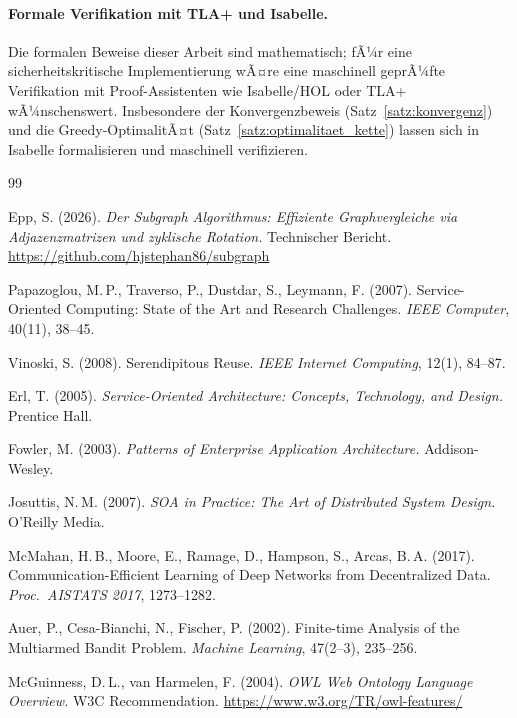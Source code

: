 ﻿\documentclass[a4paper,12pt]{article}
\theoremstyle{definition}
\begin{document}
\paragraph{Formale Verifikation mit TLA+ und Isabelle.}
Die formalen Beweise dieser Arbeit sind mathematisch; fÃ¼r eine sicherheitskritische Implementierung wÃ¤re eine maschinell geprÃ¼fte Verifikation mit Proof-Assistenten wie Isabelle/HOL \cite{nipkow2002} oder TLA+ \cite{lamport2002} wÃ¼nschenswert. Insbesondere der Konvergenzbeweis (Satz~\ref{satz:konvergenz}) und die Greedy-OptimalitÃ¤t (Satz~\ref{satz:optimalitaet_kette}) lassen sich in Isabelle formalisieren und maschinell verifizieren.

\begin{thebibliography}{99}

Epp, S. (2026). \textit{Der Subgraph Algorithmus: Effiziente Graphvergleiche via Adjazenzmatrizen und zyklische Rotation.} Technischer Bericht. \url{https://github.com/hjstephan86/subgraph}

Papazoglou, M.\,P., Traverso, P., Dustdar, S., Leymann, F. (2007). Service-Oriented Computing: State of the Art and Research Challenges. \textit{IEEE Computer}, 40(11), 38--45.

Vinoski, S. (2008). Serendipitous Reuse. \textit{IEEE Internet Computing}, 12(1), 84--87.

Erl, T. (2005). \textit{Service-Oriented Architecture: Concepts, Technology, and Design.} Prentice Hall.

Fowler, M. (2003). \textit{Patterns of Enterprise Application Architecture.} Addison-Wesley.

Josuttis, N.\,M. (2007). \textit{SOA in Practice: The Art of Distributed System Design.} O'Reilly Media.

McMahan, H.\,B., Moore, E., Ramage, D., Hampson, S., Arcas, B.\,A. (2017). Communication-Efficient Learning of Deep Networks from Decentralized Data. \textit{Proc.\ AISTATS 2017}, 1273--1282.

Auer, P., Cesa-Bianchi, N., Fischer, P. (2002). Finite-time Analysis of the Multiarmed Bandit Problem. \textit{Machine Learning}, 47(2--3), 235--256.

McGuinness, D.\,L., van Harmelen, F. (2004). \textit{OWL Web Ontology Language Overview.} W3C Recommendation. \url{https://www.w3.org/TR/owl-features/}


\end{thebibliography}
\end{document}
